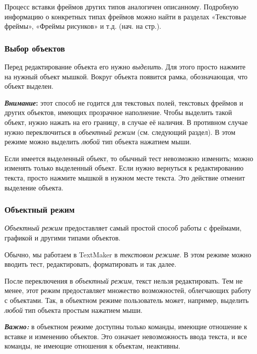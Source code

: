 \documentclass[a4paper,10pt]{article}
\begin{document}
Процесс вставки фреймов других типов аналогичен описанному. Подробную информацию о конкретных типах фреймов можно найти в разделах «Текстовые фреймы», «Фреймы рисунков» и т.д. (нач. на стр.).

\subsubsection{Выбор объектов}
Перед редактирование объекта его нужно \textit{выделить}. Для этого просто нажмите на нужный объект мышкой. Вокруг объекта появится рамка, обозначающая, что объект выделен.

\begin{mdframed}[backgroundcolor=blue!10]
\textbf{\textit{Внимание}:} этот способ не годится для текстовых полей, текстовых фреймов и других объектов, имеющих прозрачное наполнение. Чтобы выделить такой объект, нужно нажать на его границу, в случае её наличия.  В противном случае нужно переключиться в \textit{объектный режим} (см. следующий раздел). В этом режиме можно выделить \textit{любой} тип объекта нажатием мыши.
\end{mdframed}

Если имеется выделенный объект, то обычный тест невозможно изменить; можно изменять только выделенный объект. Если нужно вернуться к редактированию текста, просто нажмите мышкой в нужном месте текста. Это действие отменит выделение объекта.

\subsubsection{Объектный режим}
\textit{Объектный режим} предоставляет самый простой способ работы с фреймами, графикой и другими типами объектов.

Обычно, мы работаем в TextMaker в \textit{текстовом режиме}. В этом режиме можно вводить тест, редактировать, форматировать и так далее.

После переключения в \textit{объектный режим}, текст нельзя редактировать. Тем не менее, этот режим предоставляет множество возможностей, облегчающих работу с объектами. Так, в объектном режиме пользователь может, например, выделить \textit{любой} тип объекта простым нажатием мыши.

\begin{mdframed}[backgroundcolor=blue!10]
\textbf{\textit{Важно:}} в объектном режиме доступны только команды, имеющие отношение к вставке и изменению объектов. Это означает невозможность ввода текста, и все команды, не имеющие отношения к объектам, неактивны.
\end{mdframed}
\end{document}
